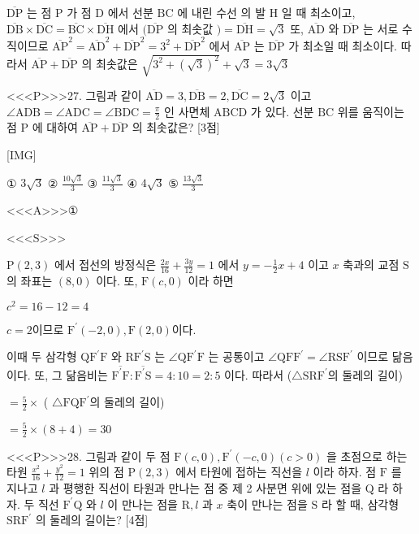 \documentclass{oblivoir}
\begin{document}
$ \overline{\mathrm{DP}}$ 는 점 $\mathrm{P}$ 가 점 $\mathrm{D}$ 에서 선분 $\mathrm{BC}$ 에 내린 수선 의 발 $\mathrm{H}$ 일 때 최소이고, $\overline{\mathrm{DB}} \times \overline{\mathrm{DC}}=\overline{\mathrm{BC}} \times \overline{\mathrm{DH}}$ 에서 $(\overline{\mathrm{DP}}$ 의 최솟값 $)=\overline{\mathrm{DH}}=\sqrt{3}$
또, $\overline{\mathrm{AD}}$ 와 $\overline{\mathrm{DP}}$ 는 서로 수직이므로 $\overline{\mathrm{AP}}^{2}=\overline{\mathrm{AD}}^{2}+\overline{\mathrm{DP}}^{2}=3^{2}+\overline{\mathrm{DP}}^{2}$ 에서 $\overline{\mathrm{AP}}$ 는 $\overline{\mathrm{DP}}$ 가 최소일 때 최소이다. 따라서 $\overline{\mathrm{AP}}+\overline{\mathrm{DP}}$ 의 최솟값은 $\sqrt{3^{2}+(\sqrt{3})^{2}}+\sqrt{3}=3 \sqrt{3}$


<<<P>>>27. 그림과 같이 $\overline{\mathrm{AD}}=3, \overline{\mathrm{DB}}=2, \overline{\mathrm{DC}}=2 \sqrt{3}$ 이고 $\angle \mathrm{ADB}=\angle \mathrm{ADC}=\angle \mathrm{BDC}=\frac{\pi}{2}$ 인 사면체 $\mathrm{ABCD}$ 가 있다. 선분 $\mathrm{BC}$ 위를 움직이는 점 $\mathrm{P}$ 에 대하여 $\overline{\mathrm{AP}}+\overline{\mathrm{DP}}$ 의 최솟값은? [3점]


[IMG]

① $3 \sqrt{3}$
② $\frac{10 \sqrt{3}}{3}$
③ $\frac{11 \sqrt{3}}{3}$
④ $4 \sqrt{3}$
⑤ $\frac{13 \sqrt{3}}{3}$



<<<A>>>①

<<<S>>>



$ \mathrm{P}(2,3)$ 에서 접선의 방정식은 $\frac{2 x}{16}+\frac{3 y}{12}=1$ 에서 $y=-\frac{1}{2} x+4$ 이고 $x$ 축과의 교점 $\mathrm{S}$ 의 좌표는 $(8,0)$ 이다.
또, $\mathrm{F}(c, 0)$ 이라 하면

$c^{2}=16-12=4$

$c=2$이므로 $\mathrm{F}^{\prime}(-2,0), \mathrm{F}(2,0)$이다.

이때 두 삼각형 $\mathrm{QF}^{\prime} \mathrm{F}$ 와 $\mathrm{RF}^{\prime} \mathrm{S}$ 는 $\angle \mathrm{QF}^{\prime} \mathrm{F}$ 는 공통이고 $\angle \mathrm{QFF}^{\prime}=\angle \mathrm{RSF}^{\prime}$ 이므로 닮음이다.
또, 그 닮음비는 $\overline{\mathrm{F}^{\prime} \mathrm{F}}: \overline{\mathrm{F}^{\prime} \mathrm{S}}=4: 10=2: 5$ 이다.
따라서 ($\triangle \mathrm{SRF}^{\prime}$의 둘레의 길이)

$=\frac{5}{2} \times$ ( $\triangle \mathrm{FQF}^{\prime}$의 둘레의 길이)

$=\frac{5}{2} \times(8+4)=30$


<<<P>>>28. 그림과 같이 두 점 $\mathrm{F}(c, 0), \mathrm{F}^{\prime}(-c, 0)(c>0)$ 을 초점으로 하는 타원 $\frac{x^{2}}{16}+\frac{y^{2}}{12}=1$ 위의 점 $\mathrm{P}(2,3)$ 에서 타원에 접하는 직선을 $l$ 이라 하자. 점 $\mathrm{F}$ 를 지나고 $l$ 과 평행한 직선이 타원과 만나는 점 중 제 2 사분면 위에 있는 점을 $\mathrm{Q}$ 라 하자. 두 직선 $\mathrm{F}^{\prime} \mathrm{Q}$ 와 $l$ 이 만나는 점을 $\mathrm{R}, l$ 과 $x$ 축이 만나는 점을 $\mathrm{S}$ 라 할 때, 삼각형 $\mathrm{SRF}^{\prime}$ 의 둘레의 길이는? [4점]
\end{document}
